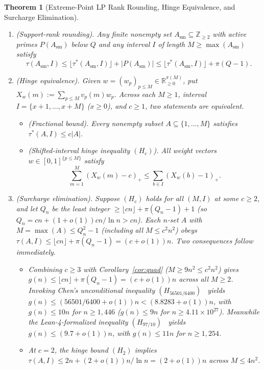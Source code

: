 \documentclass[11pt]{article}
\newtheorem{theorem}{Theorem}
\theoremstyle{remark}
\begin{document}
\begin{theorem}[Extreme-Point LP Rank Rounding, Hinge Equivalence, and Surcharge Elimination]
\label{thm:lp}
\leavevmode
\begin{enumerate}
\item \emph{(Support-rank rounding).} Any finite nonempty set $A_{\mathrm{sm}} \subseteq \mathbb{Z}_{\ge 2}$ with active primes $P(A_{\mathrm{sm}})$ below $Q$ and any interval $I$ of length $M \ge \max(A_{\mathrm{sm}})$ satisfy
\[
\tau(A_{\mathrm{sm}}, I) \le \lfloor \tau^*(A_{\mathrm{sm}}, I) \rfloor + |P(A_{\mathrm{sm}})| \le \lfloor \tau^*(A_{\mathrm{sm}}, I) \rfloor + \pi(Q - 1).
\]
\item \emph{(Hinge equivalence).} Given $w = (w_p)_{p \le M} \in \mathbb{R}_{\ge 0}^{\pi(M)}$, put $X_w(m) := \sum_{p \le M} v_p(m) w_p$. Across each $M \ge 1$, interval $I = \{x + 1, \dots, x + M\}$ ($x \ge 0$), and $c \ge 1$, two statements are equivalent.
\begin{itemize}
\item \emph{(Fractional bound).} Every nonempty subset $A \subseteq \{1, \dots, M\}$ satisfies $\tau^*(A, I) \le c |A|$.
\item \emph{(Shifted-interval hinge inequality $(H_c)$).} All weight vectors $w \in [0, 1]^{\{p \le M\}}$ satisfy
\[
\sum_{m = 1}^M (X_w(m) - c)_+ \le \sum_{b \in I} (X_w(b) - 1)_+.
\]
\end{itemize}
\item \emph{(Surcharge elimination).} Suppose $(H_c)$ holds for all $(M, I)$ at some $c \ge 2$, and let $Q_n$ be the least integer $\ge \lfloor c n \rfloor + \pi(Q_n - 1) + 1$ (so $Q_n = c n + (1 + o(1)) c n / \ln n > c n$). Each $n$-set $A$ with $M = \max(A) \le Q_n^2 - 1$ (including all $M \le c^2 n^2$) obeys $\tau(A, I) \le \lfloor c n \rfloor + \pi(Q_n - 1) = (c + o(1)) n$. Two consequences follow immediately.
\begin{itemize}
\item Combining $c \ge 3$ with Corollary~\ref{cor:quad} ($M \ge 9 n^2 \le c^2 n^2$) gives $g(n) \le \lfloor c n \rfloor + \pi(Q_n - 1) = (c + o(1)) n$ across all $M \ge 2$. Invoking Chen's unconditional inequality $(H_{56501 / 6400})$~\cite{chen26} yields $g(n) \le (56501 / 6400 + o(1)) n < (8.8283 + o(1)) n$, with $g(n) \le 10 n$ for $n \ge 1{,}446$ ($g(n) \le 9 n$ for $n \ge 4.11 \times 10^{27}$). Meanwhile the Lean-4-formalized inequality $(H_{97 / 10})$~\cite{chen26} yields $g(n) \le (9.7 + o(1)) n$, with $g(n) \le 11 n$ for $n \ge 1{,}254$.
\item At $c = 2$, the hinge bound $(H_2)$ implies $\tau(A, I) \le 2 n + (2 + o(1)) n / \ln n = (2 + o(1)) n$ across $M \le 4 n^2$.
\end{itemize}
\end{enumerate}
\end{theorem}
\end{document}
